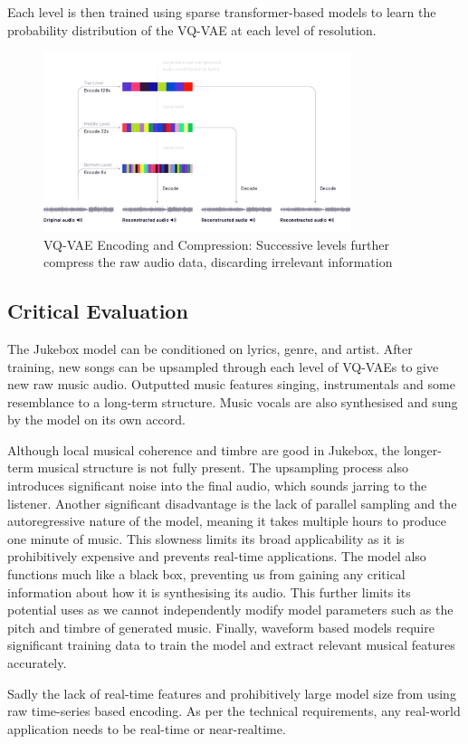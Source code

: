 Each level is then trained using sparse transformer-based models to learn the probability distribution of the VQ-VAE at each level of resolution.

\begin{figure}[!ht]
    \centering
    \includegraphics[width=0.8\textwidth]{literature_review/vq-vae.png}
    \caption{VQ-VAE Encoding and Compression: Successive levels further compress the raw audio data, discarding irrelevant information}
    \label{fig:jukebox_example}
\end{figure}

\subsection{Critical Evaluation}

The Jukebox model can be conditioned on lyrics, genre, and artist. After training, new songs can be upsampled through each level of VQ-VAEs to give new raw music audio. Outputted music features singing, instrumentals and some resemblance to a long-term structure. Music vocals are also synthesised and sung by the model on its own accord.

Although local musical coherence and timbre are good in Jukebox, the longer-term musical structure is not fully present. The upsampling process also introduces significant noise into the final audio, which sounds jarring to the listener. Another significant disadvantage is the lack of parallel sampling and the autoregressive nature of the model, meaning it takes multiple hours to produce one minute of music. This slowness limits its broad applicability as it is prohibitively expensive and prevents real-time applications. The model also functions much like a black box, preventing us from gaining any critical information about how it is synthesising its audio. This further limits its potential uses as we cannot independently modify model parameters such as the pitch and timbre of generated music. Finally, waveform based models require significant training data to train the model and extract relevant musical features accurately.

Sadly the lack of real-time features and prohibitively large model size from using raw time-series based encoding. As per the technical requirements, any real-world application needs to be real-time or near-realtime.